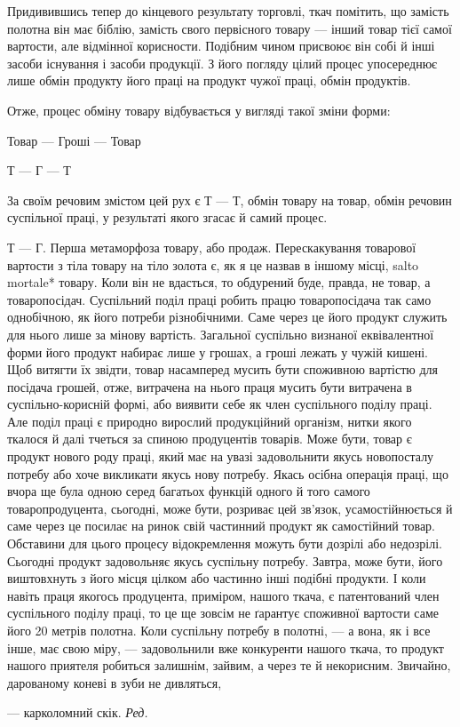 Придивившись тепер до кінцевого результату торговлі, ткач
помітить, що замість полотна він має біблію, замість свого первісного
товару — інший товар тієї самої вартости, але відмінної
корисности. Подібним чином присвоює він собі й інші засоби
існування і засоби продукції. З його погляду цілий процес
упосереднює лише обмін продукту його праці на продукт чужої
праці, обмін продуктів.

Отже, процес обміну товару відбувається у вигляді такої зміни
форми:

Товар — Гроші — Товар

Т — Г — Т

За своїм речовим змістом цей рух є Т — Т, обмін товару на
товар, обмін речовин суспільної праці, у результаті якого згасає
й самий процес.

Т — Г. Перша метаморфоза товару, або продаж. Перескакування
товарової вартости з тіла товару на тіло золота є, як я
це назвав в іншому місці, salto mortale* товару. Коли він не
вдасться, то обдурений буде, правда, не товар, а товаропосідач.
Суспільний поділ праці робить працю товаропосідача так само
однобічною, як його потреби різнобічними. Саме через це його
продукт служить для нього лише за мінову вартість. Загальної
суспільно визнаної еквівалентної форми його продукт набирає
лише у грошах, а гроші лежать у чужій кишені. Щоб витягти
їх звідти, товар насамперед мусить бути споживною вартістю
для посідача грошей, отже, витрачена на нього праця мусить
бути витрачена в суспільно-корисній формі, або виявити себе
як член суспільного поділу праці. Але поділ праці є природно
вирослий продукційний організм, нитки якого ткалося й далі
тчеться за спиною продуцентів товарів. Може бути, товар є продукт
нового роду праці, який має на увазі задовольнити якусь
новопосталу потребу або хоче викликати якусь нову потребу.
Якась осібна операція праці, що вчора ще була одною серед
багатьох функцій одного й того самого товаропродуцента, сьогодні,
може бути, розриває цей зв’язок, усамостійнюється й
саме через це посилає на ринок свій частинний продукт як самостійний
товар. Обставини для цього процесу відокремлення можуть
бути дозрілі або недозрілі. Сьогодні продукт задовольняє
якусь суспільну потребу. Завтра, може бути, його виштовхнуть
з його місця цілком або частинно інші подібні продукти. І коли
навіть праця якогось продуцента, приміром, нашого ткача, є
патентований член суспільного поділу праці, то це ще зовсім
не ґарантує споживної вартости саме його 20 метрів полотна.
Коли суспільну потребу в полотні, — а вона, як і все інше, має
свою міру, — задовольнили вже конкуренти нашого ткача, то
продукт нашого приятеля робиться залишнім, зайвим, а через
те й некорисним. Звичайно, дарованому коневі в зуби не дивляться,

— карколомний скік. \emph{Ред.}
\parbreak{}  %
